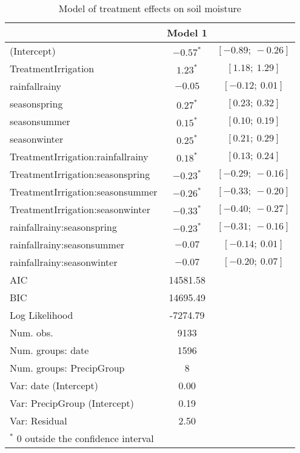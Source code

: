 \documentclass[11pt]{article}
\begin{document}
\begin{table}
	\caption{Model of treatment effects on soil moisture}
	\begin{center}
		\begin{tabular}{l c c }
			\hline
			& Model 1 \\
			\hline
			(Intercept)                       & $-0.57^{*}$       & $[-0.89;\ -0.26]$ \\
			TreatmentIrrigation               & $1.23^{*}$        & $[1.18;\ 1.29]$   \\
			rainfallrainy                     & $-0.05$           & $[-0.12;\ 0.01]$  \\
			seasonspring                      & $0.27^{*}$        & $[0.23;\ 0.32]$   \\
			seasonsummer                      & $0.15^{*}$        & $[0.10;\ 0.19]$   \\
			seasonwinter                      & $0.25^{*}$        & $[0.21;\ 0.29]$   \\
			TreatmentIrrigation:rainfallrainy & $0.18^{*}$        & $[0.13;\ 0.24]$   \\
			TreatmentIrrigation:seasonspring  & $-0.23^{*}$       & $[-0.29;\ -0.16]$ \\
			TreatmentIrrigation:seasonsummer  & $-0.26^{*}$       & $[-0.33;\ -0.20]$ \\
			TreatmentIrrigation:seasonwinter  & $-0.33^{*}$       & $[-0.40;\ -0.27]$ \\
			rainfallrainy:seasonspring        & $-0.23^{*}$       & $[-0.31;\ -0.16]$ \\
			rainfallrainy:seasonsummer        & $-0.07$           & $[-0.14;\ 0.01]$  \\
			rainfallrainy:seasonwinter        & $-0.07$           & $[-0.20;\ 0.07]$  \\
			\hline
			AIC                               & 14581.58          \\
			BIC                               & 14695.49          \\
			Log Likelihood                    & -7274.79          \\
			Num. obs.                         & 9133              \\
			Num. groups: date                 & 1596              \\
			Num. groups: PrecipGroup          & 8                 \\
			Var: date (Intercept)      		  & 0.00              \\
			Var: PrecipGroup (Intercept)      & 0.19              \\
			Var: Residual                     & 2.50              \\
			\hline
			\multicolumn{2}{l}{\scriptsize{$^*$ 0 outside the confidence interval}}
		\end{tabular}
		\label{table:soil_moisture_model}
	\end{center}
\end{table}
\end{document}
